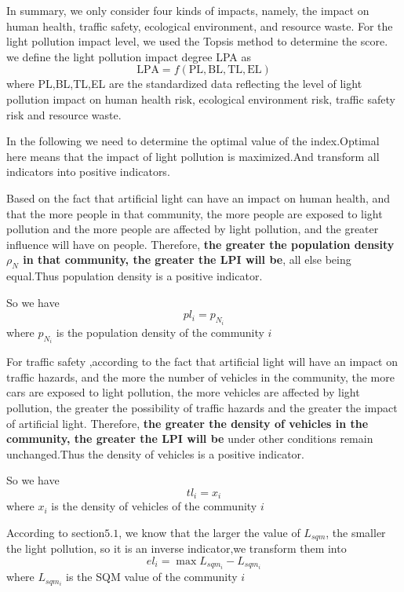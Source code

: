 \documentclass[12pt]{article}
\begin{document}
In summary, we only consider four kinds of impacts, namely, the impact on human health, traffic safety, ecological environment, and resource waste. For the light pollution impact level, we used the Topsis method to determine the score. we define the light pollution impact degree LPA as
\begin{equation}\mathrm{LPA}=f(\text{PL},\text{BL},\text{TL},\text{EL})\end{equation}
where PL,BL,TL,EL are the standardized data reflecting the level of light pollution impact on human health risk, ecological environment risk, traffic safety risk and resource waste.

In the following we need to determine the optimal value of the index.Optimal here means that the impact of light pollution is maximized.And transform all indicators into positive indicators.

Based on the fact that artificial light can have an impact on human health, and that the more people in that community, the more people are exposed to light pollution and the more people are affected by light pollution, and the greater influence will have on people. Therefore, \textbf{the greater the population density $\rho_N$ in that community, the greater the LPI will be}, all else being equal.Thus population density is a positive indicator.

So we have $$pl_i=p_{N_i}$$where $p_{N_i}$ is the population density of the community $i$

For traffic safety ,according to the fact that artificial light will have an impact on traffic hazards, and the more the number of vehicles in the community, the more cars are exposed to light pollution, the more vehicles are affected by light pollution, the greater the possibility of traffic hazards and the greater the impact of artificial light. Therefore,\textbf{ the greater the density of vehicles in the community, the greater the LPI will be} under other conditions remain unchanged.Thus the density of vehicles is a positive indicator.

So we have $$tl_i=x_i$$where $x_i$ is the density of vehicles of the community $i$




According to section$5.1$, we know that the larger the value of $L_{sqm}$, the smaller the light pollution, so it is an inverse indicator,we transform them into
$$el_i=\max{L_{sqm_i}}-L_{sqm_i}$$
where $L_{sqm_i}$ is the SQM value of the community $i$
\end{document}
